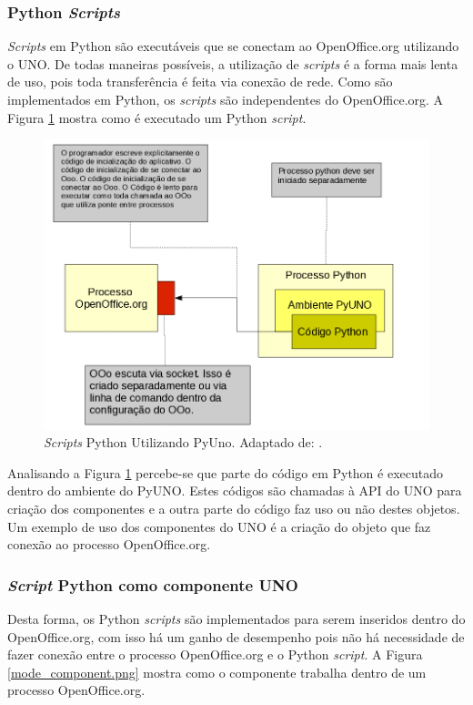 \subsubsection{Python \textit{Scripts}}
\textit{Scripts} em Python são executáveis que se conectam ao OpenOffice.org utilizando o UNO. De todas maneiras possíveis, a utilização de \textit{scripts} é a forma mais lenta de uso, pois toda transferência é feita via conexão de rede. Como são implementados em Python, os \textit{scripts} são independentes do OpenOffice.org. A Figura \ref{pyuno.png} mostra como é executado um Python \textit{script}.
\begin{figure}[ht]
\centering
\includegraphics[scale=0.45,bb=0 0 634 460]{pyuno2.png}
\caption{\textit{Scripts} Python Utilizando PyUno. Adaptado de: \cite{web:uno}.}
\label{pyuno.png}
\end{figure}

Analisando a Figura \ref{pyuno.png} percebe-se que parte do código em Python é executado dentro do ambiente do PyUNO. Estes códigos são chamadas à API do UNO para criação dos componentes e a outra parte do código faz uso ou não destes objetos. Um exemplo de uso dos componentes do UNO é a criação do objeto que faz conexão ao processo OpenOffice.org.

\subsubsection{\textit{Script} Python como componente UNO}

Desta forma, os Python \textit{scripts} são implementados para serem inseridos dentro do OpenOffice.org, com isso há um ganho de desempenho pois não há necessidade de fazer conexão entre o processo OpenOffice.org e o Python \textit{script}. A Figura \ref{mode_component.png} mostra como o componente trabalha dentro de um processo OpenOffice.org.

